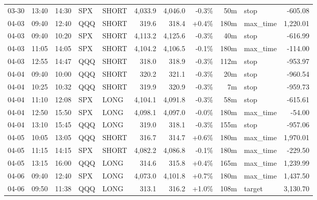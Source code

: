 \documentclass[11pt,a4paper,twoside]{article}
\begin{document}
\begin{center}
\begin{longtable}{>{\color{txtmain}}l l l l l r r r r >{\color{txtmain}}l r}
03-30 & 13:40 & 14:30 & SPX & SHORT & 4,033.9 & 4,046.0 & \textcolor{lossred}{-0.3\%} & 50m & stop & \textcolor{lossred}{-605.08} \\
04-03 & 09:40 & 12:40 & QQQ & SHORT & 319.6 & 318.4 & \textcolor{wingreen}{+0.4\%} & 180m & max\_time & \textcolor{wingreen}{1,220.01} \\
04-03 & 09:40 & 10:20 & SPX & SHORT & 4,113.2 & 4,125.6 & \textcolor{lossred}{-0.3\%} & 40m & stop & \textcolor{lossred}{-616.99} \\
04-03 & 11:05 & 14:05 & SPX & SHORT & 4,104.2 & 4,106.5 & \textcolor{lossred}{-0.1\%} & 180m & max\_time & \textcolor{lossred}{-114.00} \\
04-03 & 12:55 & 14:47 & QQQ & SHORT & 318.0 & 318.9 & \textcolor{lossred}{-0.3\%} & 112m & stop & \textcolor{lossred}{-953.97} \\
04-04 & 09:40 & 10:00 & QQQ & SHORT & 320.2 & 321.1 & \textcolor{lossred}{-0.3\%} & 20m & stop & \textcolor{lossred}{-960.54} \\
04-04 & 10:25 & 10:32 & QQQ & SHORT & 319.9 & 320.9 & \textcolor{lossred}{-0.3\%} & 7m & stop & \textcolor{lossred}{-959.73} \\
04-04 & 11:10 & 12:08 & SPX & LONG & 4,104.1 & 4,091.8 & \textcolor{lossred}{-0.3\%} & 58m & stop & \textcolor{lossred}{-615.61} \\
04-04 & 12:50 & 15:50 & SPX & LONG & 4,098.1 & 4,097.0 & \textcolor{lossred}{-0.0\%} & 180m & max\_time & \textcolor{lossred}{-54.00} \\
04-04 & 13:10 & 15:45 & QQQ & LONG & 319.0 & 318.1 & \textcolor{lossred}{-0.3\%} & 155m & stop & \textcolor{lossred}{-957.06} \\
04-05 & 10:05 & 13:05 & QQQ & SHORT & 316.7 & 314.7 & \textcolor{wingreen}{+0.6\%} & 180m & max\_time & \textcolor{wingreen}{1,970.01} \\
04-05 & 11:15 & 14:15 & SPX & SHORT & 4,082.2 & 4,086.8 & \textcolor{lossred}{-0.1\%} & 180m & max\_time & \textcolor{lossred}{-229.50} \\
04-05 & 13:15 & 16:00 & QQQ & LONG & 314.6 & 315.8 & \textcolor{wingreen}{+0.4\%} & 165m & max\_time & \textcolor{wingreen}{1,239.99} \\
04-06 & 09:40 & 12:40 & SPX & LONG & 4,073.0 & 4,101.8 & \textcolor{wingreen}{+0.7\%} & 180m & max\_time & \textcolor{wingreen}{1,437.50} \\
04-06 & 09:50 & 11:38 & QQQ & LONG & 313.1 & 316.2 & \textcolor{wingreen}{+1.0\%} & 108m & target & \textcolor{wingreen}{3,130.70} \\

\end{longtable}
\end{center}
\end{document}
